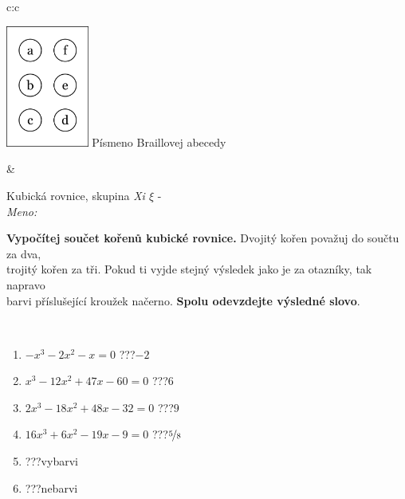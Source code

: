 \documentclass[10pt]{report}
\begin{document}
\begin{tabular}{c:c}
\begin{minipage}[c][104.5mm][t]{0.5\linewidth}
\begin{center}
\begin{minipage}{0.20\linewidth}
\begin{center}
\includegraphics[height=40mm]{../images/braille.png}
{\small Písmeno Braillovej abecedy}
\end{center}
\end{minipage}
\end{center}
\end{minipage}
&
\begin{minipage}[c][104.5mm][t]{0.5\linewidth}
\begin{center}
\vspace{7mm}
{\huge Kubická rovnice, skupina \textit{Xi $\xi$} -}\\[5mm]
\textit{Meno:}\phantom{xxxxxxxxxxxxxxxxxxxxxxxxxxxxxxxxxxxxxxxxxxxxxxxxxxxxxxxxxxxxxxxxx}\\[5mm]
\begin{minipage}{0.95\linewidth}
\textbf{Vypočítej součet kořenů kubické rovnice.} Dvojitý kořen považuj do součtu za dva,\\trojitý kořen za tři. Pokud ti vyjde stejný výsledek jako je za otazníky, tak napravo\\barvi příslušející kroužek načerno. \textbf{Spolu odevzdejte výsledné slovo}.
\end{minipage}
\\[1mm]
\begin{minipage}{0.79\linewidth}
\begin{center}
\begin{varwidth}{\linewidth}
\begin{enumerate}
\Large
\item $-x^3-2x^2-x=0$\quad \dotfill\; ???\;\dotfill \quad $-2$
\item $x^3-12x^2+47x-60=0$\quad \dotfill\; ???\;\dotfill \quad $6$
\item $2x^3-18x^2+48x-32=0$\quad \dotfill\; ???\;\dotfill \quad $9$
\item $16x^3+6x^2-19x-9=0$\quad \dotfill\; ???\;\dotfill \quad $\nicefrac{5}{8}$
\item \quad \dotfill\; ???\;\dotfill \quad vybarvi
\item \quad \dotfill\; ???\;\dotfill \quad nebarvi
\end{enumerate}

\end{varwidth}
\end{center}
\end{minipage}
\end{center}
\end{minipage}
\end{tabular}
\end{document}
